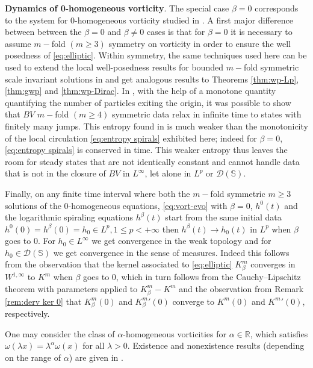 \documentclass[10pt]{article}
\theoremstyle{definition}
\theoremstyle{remark}
\numberwithin{equation}{section}
\newcommand{\0}{\emptyset}
\newcommand{\alp}{\alpha}
\newcommand{\bt}{\beta}
\newcommand{\lmb}{\lambda}
\newcommand{\omg}{\omega}
\newcommand{\bbR}{\mathbb R}
\begin{document}
	
	\medskip 
	
	\noindent\textbf{Dynamics of 0-homogeneous vorticity}.  
	The special case $\bt=0$ corresponds to the system for 0-homogeneous vorticity studied in \cite{EJ1,EMS}. A first major difference between between the $\bt=0$ and $\bt\neq 0$ cases is that for $\bt=0$ it is necessary to assume $m-$fold $(m\geq 3)$ symmetry on vorticity in order to ensure the well posedness of \eqref{eq:elliptic}. Within symmetry, the same techniques used here can be used to extend the local well-posedness results for bounded $m-$fold symmetric scale invariant solutions in \cite{EJ1} and get analogous results to Theorems \ref{thm:wp-Lp}, \ref{thm:gwp} and \ref{thm:wp-Dirac}. In \cite{EMS}, with the help of a monotone quantity quantifying the number of particles exiting the origin, it was possible to show that $BV$ $m-$fold $(m\geq 4)$ symmetric data relax in infinite time to states with finitely many jumps. This entropy found in \cite{EMS} is much weaker than the monotonicity of the local circulation  \eqref{eq:entropy spirals} exhibited here; indeed for $\beta=0$, \eqref{eq:entropy spirals} is conserved in time. This weaker entropy thus leaves the room for steady states that are not identically constant and cannot handle data that is not in the closure of $BV$  in $L^\infty$, let alone in $L^p$ or $\mathcal{D}(\mathbb{S})$.

 \medskip 

 \noindent Finally, on any finite time interval where both the $m-$fold symmetric $m\geq 3$ solutions of the 0-homogeneous equations, \eqref{eq:vort-evo}  with $\beta=0$, $h^0(t)$ and the logarithmic spiraling equations $h^\beta(t)$ start from the same initial data $h^0(0)=h^\beta(0)=h_0\in L^p, 1 \leq p <+\infty$ then $h^\beta(t) \to h_0(t)$ in $L^p$ when $\beta$ goes to $0$. For $h_0 \in L^\infty$ we get convergence in the weak topology and for $h_0 \in \mathcal{D}(\mathbb{S})$ we get convergence in the sense of measures. Indeed this follows from the observation that the kernel associated to \eqref{eq:elliptic} $K_\beta^m$ converges in $W^{1,\infty}$ to $K^m$ when $\beta $ goes to 0, which in turn follows from the Cauchy--Lipschitz theorem with parameters applied to $K^m_\beta-K^m$ and the observation from Remark \ref{rem:derv ker 0} that $K_\beta^m(0)$ and ${K_\beta^m}'(0)$ converge to $K^m(0)$ and ${K^m}'(0)$, respectively.


 \medskip 

 \noindent One may consider the class of $\alpha$-homogeneous vorticities for $\alp\in \bbR$, which satisfies $\omg(\lmb x)= \lmb^\alp \omg(x)$ for all $\lmb>0$. Existence and nonexistence results (depending on the range of $\alp$) are given in \cite{Abe}. 
 
\end{document}
